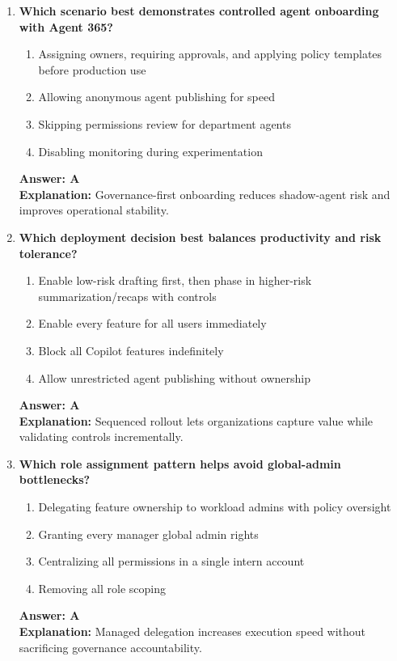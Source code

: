 \documentclass[10pt]{article}
\begin{document}
\begin{enumerate}[leftmargin=*]
\item \textbf{Which scenario best demonstrates controlled agent onboarding with Agent 365?}
\begin{enumerate}[label=\Alph*.]
  \item Assigning owners, requiring approvals, and applying policy templates before production use
  \item Allowing anonymous agent publishing for speed
  \item Skipping permissions review for department agents
  \item Disabling monitoring during experimentation
\end{enumerate}
\textbf{Answer: A}\\
\textbf{Explanation:} Governance-first onboarding reduces shadow-agent risk and improves operational stability.

\item \textbf{Which deployment decision best balances productivity and risk tolerance?}
\begin{enumerate}[label=\Alph*.]
  \item Enable low-risk drafting first, then phase in higher-risk summarization/recaps with controls
  \item Enable every feature for all users immediately
  \item Block all Copilot features indefinitely
  \item Allow unrestricted agent publishing without ownership
\end{enumerate}
\textbf{Answer: A}\\
\textbf{Explanation:} Sequenced rollout lets organizations capture value while validating controls incrementally.

\item \textbf{Which role assignment pattern helps avoid global-admin bottlenecks?}
\begin{enumerate}[label=\Alph*.]
  \item Delegating feature ownership to workload admins with policy oversight
  \item Granting every manager global admin rights
  \item Centralizing all permissions in a single intern account
  \item Removing all role scoping
\end{enumerate}
\textbf{Answer: A}\\
\textbf{Explanation:} Managed delegation increases execution speed without sacrificing governance accountability.


\end{enumerate}
\end{document}
